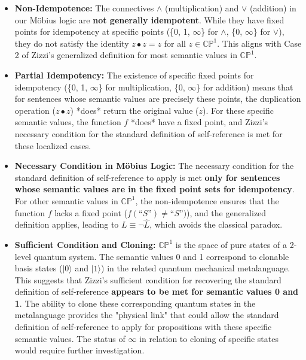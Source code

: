 \documentclass{article}
\begin{document}
	\begin{itemize}
		\item \textbf{Non-Idempotence:} The connectives \(\wedge\) (multiplication) and \(\vee\) (addition) in our M\"{o}bius logic are \textbf{not generally idempotent}. While they have fixed points for idempotency at specific points (\{0, 1, \(\infty\)\} for \(\wedge\), \{0, \(\infty\)\} for \(\vee\)), they do not satisfy the identity \(z \bullet z = z\) for all \(z \in \mathbb{CP}^1\). This aligns with Case 2 of Zizzi's generalized definition for most semantic values in \(\mathbb{CP}^1\).
		
		\item \textbf{Partial Idempotency:} The existence of specific fixed points for idempotency (\{0, 1, \(\infty\)\} for multiplication, \{0, \(\infty\)\} for addition) means that for sentences whose semantic values are precisely these points, the duplication operation (\(z \bullet z\)) *does* return the original value (\(z\)). For these specific semantic values, the function \(f\) *does* have a fixed point, and Zizzi's necessary condition for the standard definition of self-reference is met for these localized cases.
		
		\item \textbf{Necessary Condition in Möbius Logic:} The necessary condition for the standard definition of self-reference to apply is met \textbf{only for sentences whose semantic values are in the fixed point sets for idempotency}. For other semantic values in \(\mathbb{CP}^1\), the non-idempotence ensures that the function \(f\) lacks a fixed point (\(f(\text{``}S\text{''}) \neq \text{``}S\text{''})\)), and the generalized definition applies, leading to \(L \equiv \neg \widehat{L}\), which avoids the classical paradox.
		
		\item \textbf{Sufficient Condition and Cloning:} \(\mathbb{CP}^1\) is the space of pure states of a 2-level quantum system. The semantic values 0 and 1 correspond to clonable basis states (\(|0\rangle\) and \(|1\rangle\)) in the related quantum mechanical metalanguage. This suggests that Zizzi's sufficient condition for recovering the standard definition of self-reference \textbf{appears to be met for semantic values 0 and 1}. The ability to clone these corresponding quantum states in the metalanguage provides the "physical link" that could allow the standard definition of self-reference to apply for propositions with these specific semantic values. The status of \(\infty\) in relation to cloning of specific states would require further investigation.
	\end{itemize}
	
\end{document}
